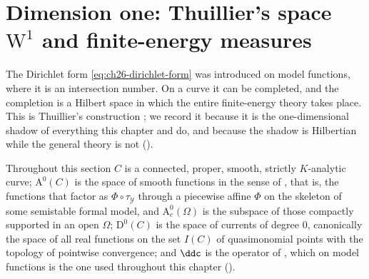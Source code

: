 \section{Dimension one: Thuillier's space
\texorpdfstring{\(\mathrm W^1\)}{W1} and finite-energy measures}
\label{sec:ch26-thuillier}

The Dirichlet form \eqref{eq:ch26-dirichlet-form} was introduced on model
functions, where it is an intersection number.  On a curve it can be
completed, and the completion is a Hilbert space in which the entire
finite-energy theory takes place.  This is Thuillier's construction
\cite[\S3.5]{Thu05}; we record it because it is the one-dimensional shadow
of everything this chapter and
 do, and because the shadow is
Hilbertian while the general theory is not
().

Throughout this section \(C\) is a connected, proper, smooth, strictly
\(K\)-analytic curve; \(\mathrm A^0(C)\) is the space of smooth functions in
the sense of \cite[\S3.2]{Thu05}, that is, the functions that factor as
\(\Phi\circ\tau_{\mathcal Y}\) through a piecewise affine \(\Phi\) on the
skeleton of some semistable formal model, and \(\mathrm A^0_c(\Omega)\) is
the subspace of those compactly supported in an open \(\Omega\);
\(\mathrm D^0(C)\) is the space of currents of degree \(0\), canonically the
space of all real functions on the set \(I(C)\) of quasimonomial points with
the topology of pointwise convergence; and \(\ddc\) is the operator of
, which on model functions is the one used
throughout this chapter ().

